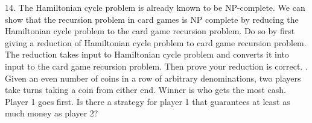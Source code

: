 \documentclass[12pt]{article}
\begin{document}
14. The Hamiltonian cycle problem is already known to be NP-complete. We can show that the recursion problem in card games is NP complete by reducing the Hamiltonian cycle problem to the card game recursion problem. Do so by first giving a reduction of Hamiltonian cycle problem to card game recursion problem. The reduction takes input to Hamiltonian cycle problem and converts it into input to the card game recursion problem. Then prove your reduction is correct.
\newpage
{}. Given an even number of coins in a row of arbitrary denominations, two players take turns taking a coin from either end. 
Winner is who gets the most cash. Player 1 goes first. 
Is there a strategy for player 1 that guarantees at least as much money as player 2?
\end{document}
